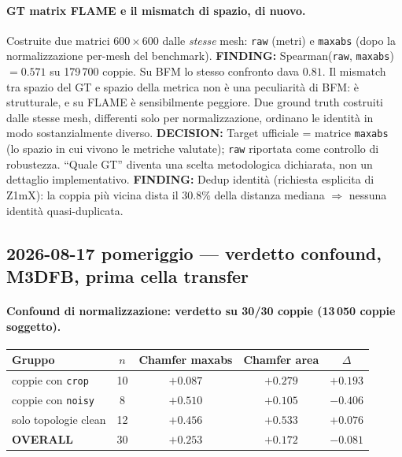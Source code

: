 \documentclass[11pt,a4paper]{article}
\newcommand{\finding}[1]{\textcolor{finding}{\textbf{FINDING:}} #1}
\newcommand{\decision}[1]{\textcolor{decision}{\textbf{DECISION:}} #1}
\begin{document}
\paragraph{GT matrix FLAME e il mismatch di spazio, di nuovo.}
Costruite due matrici $600\times600$ dalle \emph{stesse} mesh: \texttt{raw} (metri) e
\texttt{maxabs} (dopo la normalizzazione per-mesh del benchmark).
\finding{Spearman(\texttt{raw}, \texttt{maxabs}) $= \mathbf{0.571}$ su 179\,700 coppie.
Su BFM lo stesso confronto dava $0.81$. Il mismatch tra spazio del GT e spazio della
metrica non \`e una peculiarit\`a di BFM: \`e strutturale, e su FLAME \`e sensibilmente
peggiore. Due ground truth costruiti dalle stesse mesh, differenti solo per
normalizzazione, ordinano le identit\`a in modo sostanzialmente diverso.}
\decision{Target ufficiale = matrice \texttt{maxabs} (lo spazio in cui vivono le metriche
valutate); \texttt{raw} riportata come controllo di robustezza. ``Quale GT'' diventa una
scelta metodologica dichiarata, non un dettaglio implementativo.}
\finding{Dedup identit\`a (richiesta esplicita di Z1mX): la coppia pi\`u vicina dista il
$30.8\%$ della distanza mediana $\Rightarrow$ nessuna identit\`a quasi-duplicata.}

\subsection{2026-08-17 pomeriggio --- verdetto confound, M3DFB, prima cella transfer}

\paragraph{Confound di normalizzazione: verdetto su 30/30 coppie (13\,050 coppie soggetto).}

\begin{center}
\begin{tabular}{lcccc}
\toprule
Gruppo & $n$ & Chamfer maxabs & Chamfer area & $\Delta$ \\
\midrule
coppie con \texttt{crop}   & 10 & $+0.087$ & $+0.279$ & $+0.193$ \\
coppie con \texttt{noisy}  &  8 & $+0.510$ & $+0.105$ & $-0.406$ \\
solo topologie clean       & 12 & $+0.456$ & $+0.533$ & $+0.076$ \\
\midrule
\textbf{OVERALL}           & 30 & $\mathbf{+0.253}$ & $+0.172$ & $-0.081$ \\
\bottomrule
\end{tabular}
\end{center}
\end{document}
